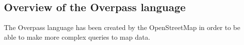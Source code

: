 \documentclass[main.tex]{subfiles}
\begin{document}
\subsection{Overview of the Overpass language}
The Overpass language \cite{overpass} has been created by the OpenStreetMap
in order to be able to make more complex queries to map data.

\end{document}
